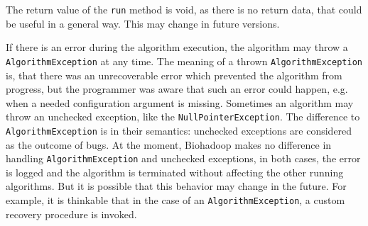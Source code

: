 The return value of the \texttt{run} method is void, as there is no return data, that could be useful in a general way. This may change in future versions.
   
If there is an error during the algorithm execution, the algorithm may throw a  \texttt{AlgorithmException} at any time. The meaning of a thrown \texttt{AlgorithmException} is, that there was an unrecoverable error which prevented the algorithm from progress, but the programmer was aware that such an error could happen, e.g. when a needed configuration argument is missing. Sometimes an algorithm may throw an unchecked exception, like the \texttt{NullPointerException}. The difference to \texttt{AlgorithmException} is in their semantics: unchecked exceptions are considered as the outcome of bugs. At the moment, Biohadoop makes no difference in handling \texttt{AlgorithmException} and unchecked exceptions, in both cases, the error is logged and the algorithm is terminated without affecting the other running algorithms. But it is possible that this behavior may change in the future. For example, it is thinkable that in the case of an \texttt{AlgorithmException}, a custom recovery procedure is invoked.
% 
%   
%   
%     
%     
%     
